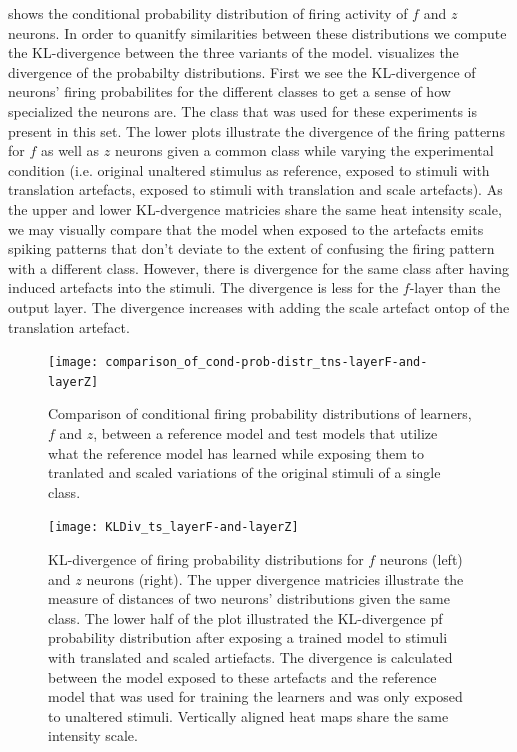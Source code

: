 \documentclass{report}
\begin{document}
 shows the conditional probability distribution of firing activity of $f$ and $z$ neurons. In order to quanitfy similarities between these distributions we compute the KL-divergence between the three variants of the model.  visualizes the divergence of the probabilty distributions. First we see the KL-divergence of neurons' firing probabilites for the different classes to get a sense of how specialized the neurons are. The class that was used for these experiments is present in this set. The lower plots illustrate the divergence of the firing patterns for $f$ as well as $z$ neurons given a common class while varying the experimental condition (i.e. original unaltered stimulus as reference, exposed to stimuli with translation artefacts, exposed to stimuli with translation and scale artefacts). As the upper and lower KL-dvergence matricies share the same heat intensity scale, we may visually compare that the model when exposed to the artefacts emits spiking patterns that don't deviate to the extent of confusing the firing pattern with a different class. However, there is divergence for the same class after having induced artefacts into the stimuli. The divergence is less for the $f$-layer than the output layer. The divergence increases with adding the scale artefact ontop of the translation artefact.

\begin{figure}[ht]
\centering
\texttt{[image: comparison\_of\_cond-prob-distr\_tns-layerF-and-layerZ]}
\caption{Comparison of conditional firing probability distributions of learners, $f$ and $z$, between a reference model and test models that utilize what the reference model has learned while exposing them to tranlated and scaled variations of the original stimuli of a single class.
\label{fig:comparison_of_cond-prob-distr_tns-layerF-and-layerZ}}
\end{figure}

\begin{figure}[ht]
\centering
\texttt{[image: KLDiv\_ts\_layerF-and-layerZ]}
\caption{KL-divergence of firing probability distributions for $f$ neurons (left) and $z$ neurons (right). The upper divergence matricies illustrate the measure of distances of two neurons' distributions given the same class. The lower half of the plot illustrated the KL-divergence pf probability distribution after exposing a trained model to stimuli with translated and scaled artiefacts. The divergence is calculated between the model exposed to these artefacts and the reference model that was used for training the learners and was only exposed to unaltered stimuli. Vertically aligned heat maps share the same intensity scale.
\label{fig:KLDiv_ts_layerF-and-layerZ}}
\end{figure}
\end{document}
